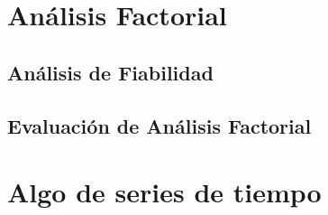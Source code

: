 \documentclass[letterpaper,]{book}
\begin{document}
\hypertarget{analisis-factorial}{%
\chapter{Análisis Factorial}\label{analisis-factorial}}

\hypertarget{analisis-de-fiabilidad}{%
\section{Análisis de Fiabilidad}\label{analisis-de-fiabilidad}}

\hypertarget{evaluacion-de-analisis-factorial}{%
\section{Evaluación de Análisis Factorial}\label{evaluacion-de-analisis-factorial}}

\hypertarget{algo-de-series-de-tiempo}{%
\chapter{Algo de series de tiempo}\label{algo-de-series-de-tiempo}}


\end{document}
